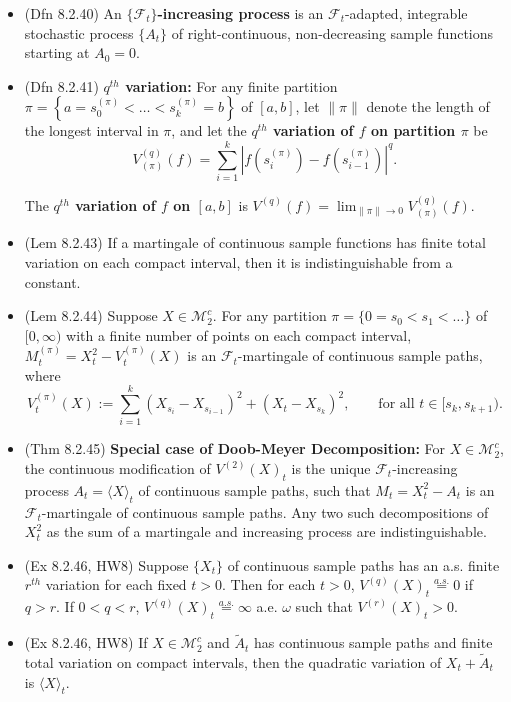 \documentclass[twoside]{article}
\newcommand{\dis}{\displaystyle}
\newcommand\calF{\mathcal{F}}
\newcommand\calM{\mathcal{M}}
\newcommand\om{\omega}
\newcommand\goesto{\rightarrow}
\begin{document}
\begin{itemize}
\item (Dfn 8.2.40) An \textbf{$\{\calF_t\}$-increasing process} is an $\calF_t$-adapted, integrable stochastic process $\{ A_t\}$ of right-continuous, non-decreasing sample functions starting at $A_0 = 0$.

\item (Dfn 8.2.41) \textbf{$q^{th}$ variation:} For any finite partition $\pi = \left\{ a = s_0^{(\pi)} < \dots < s_k^{(\pi)} = b \right\}$ of $[a,b]$, let $\| \pi \|$ denote the length of the longest interval in $\pi$, and let the \textbf{$q^{th}$ variation of $f$ on partition $\pi$} be
\[ V_{(\pi)}^{(q)} (f) = \sum_{i=1}^k \left|f(s_i^{(\pi)}) - f(s_{i-1}^{(\pi)}) \right|^q.\]

The \textbf{$q^{th}$ variation of $f$ on $[a,b]$} is $V^{(q)}(f) = \dis\lim_{\|\pi\| \goesto 0} V_{(\pi)}^{(q)} (f)$.

\item (Lem 8.2.43) If a martingale of continuous sample functions has finite total variation on each compact interval, then it is indistinguishable from a constant.

\item (Lem 8.2.44) Suppose $X \in \calM_2^c$. For any partition $\pi = \{ 0 = s_0 < s_1 < \dots \}$ of $[0 ,\infty)$ with a finite number of points on each compact interval, $M_t^{(\pi)} = X_t^2 - V_t^{(\pi)}(X)$ is an $\calF_t$-martingale of continuous sample paths, where
\[ V_t^{(\pi)}(X) := \sum_{i=1}^k (X_{s_i} - X_{s_{i-1}})^2 + (X_t - X_{s_k})^2, \qquad \text{for all } t \in [s_k, s_{k+1}). \]

\item (Thm 8.2.45) \textbf{Special case of Doob-Meyer Decomposition:} For $X \in \calM_2^c$, the continuous modification of $V^{(2)}(X)_t$ is the unique $\calF_t$-increasing process $A_t = \langle X \rangle_t$ of continuous sample paths, such that $M_t = X_t^2 - A_t$ is an $\calF_t$-martingale of continuous sample paths. Any two such decompositions of $X_t^2$ as the sum of a martingale and increasing process are indistinguishable.

\item (Ex 8.2.46, HW8) Suppose $\{ X_t\}$ of continuous sample paths has an a.s. finite $r^{th}$ variation for each fixed $t > 0$. Then for each $t > 0$, $V^{(q)}(X)_t \stackrel{a.s.}{=} 0$ if $q > r$. If $0 < q < r$, $V^{(q)}(X)_t \stackrel{a.s.}{=} \infty$ a.e. $\om$ such that $V^{(r)}(X)_t > 0$.

\item (Ex 8.2.46, HW8) If $X \in \calM_2^c$ and $\widetilde{A}_t$ has continuous sample paths and finite total variation on compact intervals, then the quadratic variation of $X_t + \widetilde{A}_t$ is $\langle X \rangle_t$.


\end{itemize}
\end{document}
